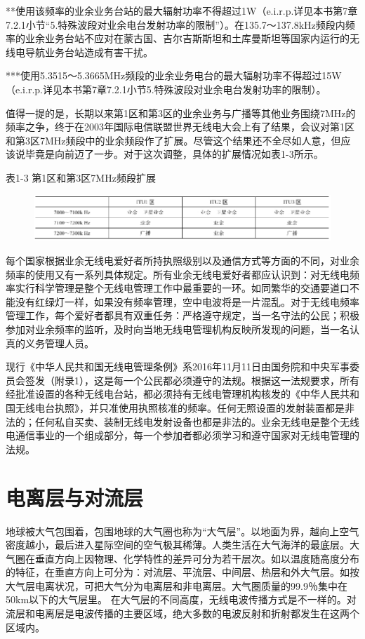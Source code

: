 \documentclass[12pt,UTF8]{ctexbook}
\begin{document}
**使用该频率的业余业务台站的最大辐射功率不得超过1W（e.i.r.p.详见本书第7章7.2.1小节“5.特殊波段对业余电台发射功率的限制”）。在135.7～137.8kHz频段内频率的业余业务台站不应对在蒙古国、吉尔吉斯斯坦和土库曼斯坦等国家内运行的无线电导航业务台站造成有害干扰。

***使用5.3515～5.3665MHz频段的业余业务电台的最大辐射功率不得超过15W（e.i.r.p.详见本书第7章7.2.1小节5.特殊波段对业余电台发射功率的限制）。

值得一提的是，长期以来第1区和第3区的业余业务与广播等其他业务围绕7MHz的频率之争，终于在2003年国际电信联盟世界无线电大会上有了结果，会议对第1区和第3区7MHz频段中的业余频段作了扩展。尽管这个结果还不全尽如人意，但应该说毕竟是向前迈了一步。对于这次调整，具体的扩展情况如表1-3所示。

表1-3 第1区和第3区7MHz频段扩展

\begin{figure}[htbp]
	\centering
	\includegraphics[width=0.7\linewidth]{82}
	\caption{}
	\label{fig:1}
\end{figure}

每个国家根据业余无线电爱好者所持执照级别以及通信方式等方面的不同，对业余频率的使用又有一系列具体规定。所有业余无线电爱好者都应认识到：对无线电频率实行科学管理是整个无线电管理工作中最重要的一环。如同繁华的交通要道口不能没有红绿灯一样，如果没有频率管理，空中电波将是一片混乱。对于无线电频率管理工作，每个爱好者都具有双重任务：严格遵守规定，当一名守法的公民；积极参加对业余频率的监听，及时向当地无线电管理机构反映所发现的问题，当一名认真的义务管理人员。

现行《中华人民共和国无线电管理条例》系2016年11月11日由国务院和中央军事委员会签发（附录1），这是每一个公民都必须遵守的法规。根据这一法规要求，所有经批准设置的各种无线电台站，都必须持有无线电管理机构核发的《中华人民共和国无线电台执照》，并只准使用执照核准的频率。任何无照设置的发射装置都是非法的；任何私自买卖、装制无线电发射设备也都是非法的。业余无线电是整个无线电通信事业的一个组成部分，每一个参加者都必须学习和遵守国家对无线电管理的法规。


\section{电离层与对流层}

地球被大气包围着，包围地球的大气圈也称为“大气层”。以地面为界，越向上空气密度越小，最后进入星际空间的空气极其稀薄。人类生活在大气海洋的最底层。大气圈在垂直方向上因物理、化学特性的差异可分为若干层次。如以温度随高度分布的特征，在垂直方向上可分为：对流层、平流层、中间层、热层和外大气层。如按大气层电离状况，可把大气分为电离层和非电离层。大气圈质量的99.9％集中在50km以下的大气层里。
在大气层的不同高度，无线电波传播方式是不一样的。对流层和电离层是电波传播的主要区域，绝大多数的电波反射和折射都发生在这两个区域内。
\end{document}
